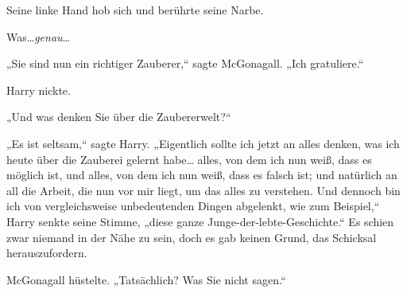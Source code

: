 Seine linke Hand hob sich und berührte seine Narbe.

Was…\emph{genau}…

„Sie sind nun ein richtiger Zauberer,“ sagte McGonagall. „Ich gratuliere.“

Harry nickte.

„Und was denken Sie über die Zaubererwelt?“

„Es ist seltsam,“ sagte Harry. „Eigentlich sollte ich jetzt an alles denken, was ich heute über die Zauberei gelernt habe… alles, von dem ich nun weiß, dass es möglich ist, und alles, von dem ich nun weiß, dass es falsch ist; und natürlich an all die Arbeit, die nun vor mir liegt, um das alles zu verstehen. Und dennoch bin ich von vergleichsweise unbedeutenden Dingen abgelenkt, wie zum Beispiel,“ Harry senkte seine Stimme, „diese ganze Junge-der-lebte-Geschichte.“ Es schien zwar niemand in der Nähe zu sein, doch es gab keinen Grund, das Schicksal herauszufordern.

McGonagall hüstelte. „Tatsächlich? Was Sie nicht sagen.“

